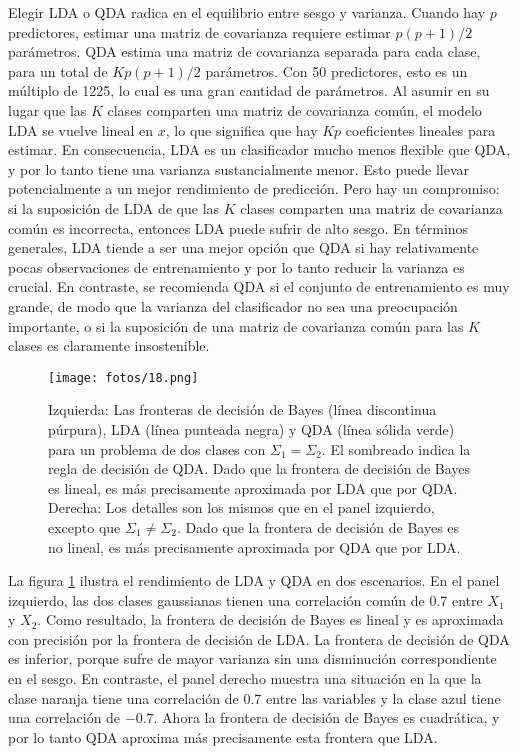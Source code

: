Elegir LDA o QDA radica en el equilibrio entre sesgo y varianza. Cuando hay $p$ predictores, estimar una matriz de covarianza requiere estimar $p(p+1)/2$ parámetros. QDA estima una matriz de covarianza separada para cada clase, para un total de $Kp(p+1)/2$ parámetros. Con 50 predictores, esto es un múltiplo de 1225, lo cual es una gran cantidad de parámetros. Al asumir en su lugar que las $K$ clases comparten una matriz de covarianza común, el modelo LDA se vuelve lineal en $x$, lo que significa que hay $Kp$ coeficientes lineales para estimar. En consecuencia, LDA es un clasificador mucho menos flexible que QDA, y por lo tanto tiene una varianza sustancialmente menor. Esto puede llevar potencialmente a un mejor rendimiento de predicción. Pero hay un compromiso: si la suposición de LDA de que las $K$ clases comparten una matriz de covarianza común es incorrecta, entonces LDA puede sufrir de alto sesgo. En términos generales, LDA tiende a ser una mejor opción que QDA si hay relativamente pocas observaciones de entrenamiento y por lo tanto reducir la varianza es crucial. En contraste, se recomienda QDA si el conjunto de entrenamiento es muy grande, de modo que la varianza del clasificador no sea una preocupación importante, o si la suposición de una matriz de covarianza común para las $K$ clases es claramente insostenible. \\

\begin{figure}[h]
\centering
\texttt{[image: fotos/18.png]}
\caption{Izquierda: Las fronteras de decisión de Bayes (línea discontinua púrpura), LDA (línea punteada negra) y QDA (línea sólida verde) para un problema de dos clases con $\Sigma_1 = \Sigma_2$. El sombreado indica la regla de decisión de QDA. Dado que la frontera de decisión de Bayes es lineal, es más precisamente aproximada por LDA que por QDA. Derecha: Los detalles son los mismos que en el panel izquierdo, excepto que $\Sigma_1 \neq \Sigma_2$. Dado que la frontera de decisión de Bayes es no lineal, es más precisamente aproximada por QDA que por LDA.}
\label{fig:4.9}
\end{figure}

La figura \ref{fig:4.9} ilustra el rendimiento de LDA y QDA en dos escenarios. En el panel izquierdo, las dos clases gaussianas tienen una correlación común de 0.7 entre $X_1$ y $X_2$. Como resultado, la frontera de decisión de Bayes es lineal y es aproximada con precisión por la frontera de decisión de LDA. La frontera de decisión de QDA es inferior, porque sufre de mayor varianza sin una disminución correspondiente en el sesgo. En contraste, el panel derecho muestra una situación en la que la clase naranja tiene una correlación de 0.7 entre las variables y la clase azul tiene una correlación de $-0.7$. Ahora la frontera de decisión de Bayes es cuadrática, y por lo tanto QDA aproxima más precisamente esta frontera que LDA.